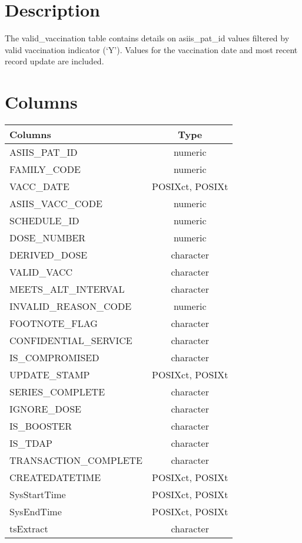\documentclass[
  letterpaper,
  DIV=11,
  numbers=noendperiod]{scrreprt}
\begin{document}
\hypertarget{description-52}{%
\section*{Description}\label{description-52}}

The valid\_vaccination table contains details on asiis\_pat\_id values
filtered by valid vaccination indicator (`Y'). Values for the
vaccination date and most recent record update are included.

\hypertarget{columns-52}{%
\section*{Columns}\label{columns-52}}

\begin{longtable}{lc}
\toprule
Columns & Type \\ 
\midrule
ASIIS\_PAT\_ID & numeric \\ 
FAMILY\_CODE & numeric \\ 
VACC\_DATE & POSIXct, POSIXt \\ 
ASIIS\_VACC\_CODE & numeric \\ 
SCHEDULE\_ID & numeric \\ 
DOSE\_NUMBER & numeric \\ 
DERIVED\_DOSE & character \\ 
VALID\_VACC & character \\ 
MEETS\_ALT\_INTERVAL & character \\ 
INVALID\_REASON\_CODE & numeric \\ 
FOOTNOTE\_FLAG & character \\ 
CONFIDENTIAL\_SERVICE & character \\ 
IS\_COMPROMISED & character \\ 
UPDATE\_STAMP & POSIXct, POSIXt \\ 
SERIES\_COMPLETE & character \\ 
IGNORE\_DOSE & character \\ 
IS\_BOOSTER & character \\ 
IS\_TDAP & character \\ 
TRANSACTION\_COMPLETE & character \\ 
CREATEDATETIME & POSIXct, POSIXt \\ 
SysStartTime & POSIXct, POSIXt \\ 
SysEndTime & POSIXct, POSIXt \\ 
tsExtract & character \\ 
\bottomrule
\end{longtable}
\end{document}
